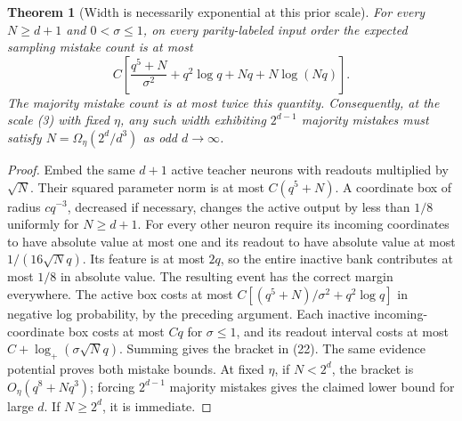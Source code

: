 \documentclass[11pt]{article}
\newtheorem{theorem}{Theorem}\newtheorem{lemma}[theorem]{Lemma}
\begin{document}
\begin{theorem}[Width is necessarily exponential at this prior scale]
For every $N\ge d+1$ and $0<\sigma\le1$, on every parity-labeled input
order the expected sampling mistake count is at most
\[
 C\left[\frac{q^5+N}{\sigma^2}+q^2\log q
                                  +Nq+N\log(Nq)\right].       \tag{22}
\]
The majority mistake count is at most twice this quantity.
Consequently, at the scale (3) with fixed $\eta$, any such width
exhibiting $2^{d-1}$ majority mistakes must satisfy
$N=\Omega_\eta(2^d/d^3)$ as odd $d\to\infty$.
\end{theorem}
\begin{proof}
Embed the same $d+1$ active teacher neurons with readouts multiplied by
$\sqrt N$. Their squared parameter norm is at most $C(q^5+N)$.
A coordinate box of radius $cq^{-3}$, decreased if necessary, changes
the active output by less than $1/8$ uniformly for $N\ge d+1$.
For every other neuron require its incoming coordinates to have absolute
value at most one and its readout to have absolute value at most
$1/(16\sqrt N q)$. Its feature is at most $2q$, so the entire inactive
bank contributes at most $1/8$ in absolute value. The resulting event
has the correct margin everywhere.
The active box costs at most $C[(q^5+N)/\sigma^2+q^2\log q]$ in
negative log probability, by the preceding argument. Each inactive
incoming-coordinate box costs at most $Cq$ for $\sigma\le1$, and its
readout interval costs at most $C+\log_+(\sigma\sqrt N q)$.
Summing gives the bracket in (22). The same evidence potential proves
both mistake bounds.
At fixed $\eta$, if $N<2^d$, the bracket is
$O_\eta(q^8+Nq^3)$; forcing $2^{d-1}$ majority mistakes gives the
claimed lower bound for large $d$. If $N\ge2^d$, it is immediate.
\end{proof}
\end{document}
